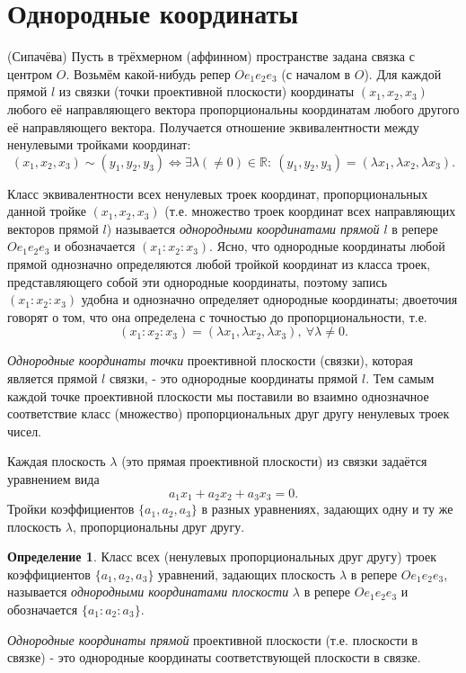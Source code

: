 \documentclass[a4paper, 12pt]{article}
\theoremstyle{definition}
\newtheorem*{definition}{Определение}
\begin{document}
\section{Однородные координаты}
(Сипачёва) Пусть в трёхмерном (аффинном) пространстве задана связка с центром $O$.
Возьмём какой-нибудь репер $Oe_1e_2e_3$ (с началом в $O$). Для каждой прямой $l$ из связки (точки проективной плоскости) координаты $(x_1, x_2, x_3)$ любого её направляющего вектора пропорциональны координатам любого другого её направляющего вектора.
Получается отношение эквивалентности между ненулевыми тройками координат: \[(x_1, x_2, x_3) \sim (y_1, y_2, y_3) \Leftrightarrow \exists \lambda (\neq 0) \in \mathbb{R}: \ (y_1, y_2, y_3) = (\lambda x_1, \lambda x_2, \lambda x_3). \]

Класс эквивалентности всех ненулевых троек координат, пропорциональных данной тройке $(x_1, x_2, x_3)$ (т.е. множество троек координат всех направляющих векторов прямой $l$) называется \textit{однородными координатами прямой $l$} в репере $Oe_1e_2e_3$ и обозначается $(x_1:x_2:x_3)$. Ясно, что однородные координаты любой прямой однозначно определяются любой тройкой координат из класса троек, представляющего собой эти однородные координаты, поэтому запись $(x_1:x_2:x_3)$ удобна и однозначно определяет однородные координаты; двоеточия говорят о том, что она определена с точностью до пропорциональности, т.е. 
\[ (x_1:x_2:x_3) =  (\lambda x_1, \lambda x_2, \lambda x_3), \ \forall \lambda \neq 0.\]

\textit{Однородные координаты точки} проективной плоскости (связки), которая является прямой $l$ связки, - это однородные координаты прямой $l$. Тем самым каждой точке проективной плоскости мы поставили во взаимно однозначное соответствие класс (множество) пропорциональных друг другу ненулевых троек чисел.

Каждая плоскость $\lambda$ (это прямая проективной плоскости) из связки задаётся уравнением вида 
\[ a_1x_1 + a_2x_2 + a_3x_3 = 0. \]
Тройки коэффициентов $\{a_1,a_2,a_3\}$ в разных уравнениях, задающих одну и ту же плоскость $\lambda$, пропорциональны друг другу.

\begin{definition}
    Класс всех (ненулевых пропорциональных друг другу) троек коэффициентов $\{a_1,a_2,a_3\}$ уравнений, задающих плоскость $\lambda$ в репере $Oe_1e_2e_3$, называется \textit{однородными координатами плоскости} $\lambda$ в репере $Oe_1e_2e_3$ и обозначается $\{a_1:a_2:a_3\}$.

    \textit{Однородные координаты прямой} проективной плоскости (т.е. плоскости в связке) - это однородные координаты соответствующей плоскости в связке.
\end{definition}
\end{document}
